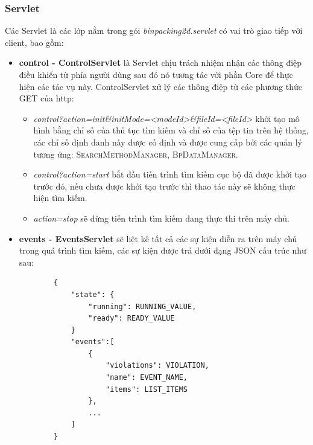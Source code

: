 \subsubsection{Servlet}
Các Servlet là các lớp nằm trong gói \textit{binpacking2d.servlet} có vai trò giao tiếp với client, bao gồm:
\begin{itemize}
	\item \textbf{control - ControlServlet} là Servlet chịu trách nhiệm nhận các thông điệp điều khiển từ phía người dùng sau đó nó tương tác với phần Core để thực hiện các tác vụ này. \textsf{ControlServlet} xử lý các thông điệp từ các phương thức GET của http:
	\begin{itemize}
		\item \textit{control?action=init{\&}initMode=<modeId>{\&}fileId=<fileId>} khởi tạo mô hình bằng chỉ số của thủ tục tìm kiếm và chỉ số của tệp tin trên hệ thống, các chỉ số định danh này được cố định và được cung cấp bởi các quản lý tương ứng: \textsc{SearchMethodManager, BpDataManager}.
		\item \textit{control?action=start} bắt đầu tiến trình tìm kiếm cục bộ đã được khởi tạo trước đó, nếu chưa được khởi tạo trước thì thao tác này sẽ không thực hiện tìm kiếm.
		\item \textit{action=stop} sẽ dừng tiến trình tìm kiếm đang thực thi trên máy chủ.
	\end{itemize}
	\item \textbf{events - EventsServlet} sẽ liệt kê tất cả các sự kiện diễn ra trên máy chủ trong quá trình tìm kiếm, các sự kiện được trả dưới dạng JSON cấu trúc như sau: 
		\begin{lstlisting}
		{
			"state": {
				"running": RUNNING_VALUE,
				"ready": READY_VALUE
			}
			"events":[
				{
					"violations": VIOLATION,
					"name": EVENT_NAME,
					"items": LIST_ITEMS
				},
				...
			]
		}
		\end{lstlisting}
	

\end{itemize}
